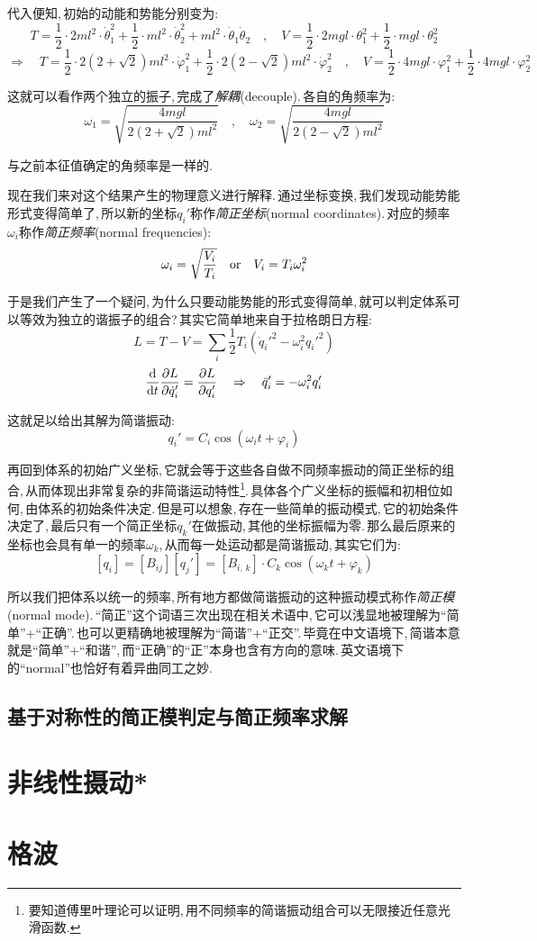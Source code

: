 代入便知,\,初始的动能和势能分别变为:
\[T=\frac{1}{2}\cdot 2ml^2\cdot\dot{\theta}_1^2+\frac{1}{2}\cdot ml^2\cdot\dot{\theta}_2^2+ml^2\cdot\dot{\theta}_1\dot{\theta}_2 \quad,\quad V=\frac{1}{2}\cdot 2mgl\cdot{\theta}_1^2+\frac{1}{2}\cdot mgl\cdot{\theta}_2^2\]
\[\Rightarrow \quad T=\frac{1}{2}\cdot 2(2+\sqrt{2})ml^2\cdot \dot{\varphi}_1^2+\frac{1}{2}\cdot 2(2-\sqrt{2})ml^2\cdot \dot{\varphi}_2^2\quad,\quad V=\frac{1}{2}\cdot 4mgl\cdot \varphi_1^2+\frac{1}{2}\cdot 4mgl\cdot \varphi_2^2\]

这就可以看作两个独立的振子,\,完成了\emph{解耦}(decouple).\,各自的角频率为:
\[\omega_1=\sqrt{\frac{4mgl}{2(2+\sqrt{2})ml^2}}\quad,\quad \omega_2=\sqrt{\frac{4mgl}{2(2-\sqrt{2})ml^2}}\]

与之前本征值确定的角频率是一样的.

现在我们来对这个结果产生的物理意义进行解释.\,通过坐标变换,\,我们发现动能势能形式变得简单了,\,所以新的坐标$q_i'$称作\emph{简正坐标}(normal coordinates).\,对应的频率$\omega_i$称作\emph{简正频率}(normal frequencies):
\[\omega_i=\sqrt\frac{V_i}{T_i}\quad {\rm or}\quad V_i=T_i\omega_i^2 \]

于是我们产生了一个疑问,\,为什么只要动能势能的形式变得简单,\,就可以判定体系可以等效为独立的谐振子的组合?\,其实它简单地来自于拉格朗日方程:
\[L=T-V=\sum_i\frac{1}{2}T_i(\dot{q}_i'^2-\omega_i^2q_i'^2)\]
\[\frac{\textrm{d} }{\textrm{d} t}\frac{\partial L}{\partial \dot{q}_i'}=\frac{\partial L}{\partial {q}_i'}\quad \Rightarrow \quad \ddot{q}'_i=-\omega_i^2q_i'\]

这就足以给出其解为简谐振动:
\[q_i'=C_i\cos(\omega_i t+\varphi_i)\]

再回到体系的初始广义坐标,\,它就会等于这些各自做不同频率振动的简正坐标的组合,\,从而体现出非常复杂的非简谐运动特性\footnote{要知道傅里叶理论可以证明,\,用不同频率的简谐振动组合可以无限接近任意光滑函数.}.\,具体各个广义坐标的振幅和初相位如何,\,由体系的初始条件决定.\,但是可以想象,\,存在一些简单的振动模式,\,它的初始条件决定了,\,最后只有一个简正坐标$q_k'$在做振动,\,其他的坐标振幅为零.\,那么最后原来的坐标也会具有单一的频率$\omega_k$,\,从而每一处运动都是简谐振动,\,其实它们为:
\[[q_i]=[B_{ij}][q_j']=[B_{i,\,k}]\cdot C_k\cos(\omega_k t+\varphi_k)\]

所以我们把体系以统一的频率,\,所有地方都做简谐振动的这种振动模式称作\emph{简正模}(normal mode).\,``简正''这个词语三次出现在相关术语中,\,它可以浅显地被理解为``简单''+``正确''.\,也可以更精确地被理解为``简谐''+``正交''.\,毕竟在中文语境下,\,简谐本意就是``简单''+``和谐'',\,而``正确''的``正''本身也含有方向的意味.\,英文语境下的``normal''也恰好有着异曲同工之妙.

\subsection{基于对称性的简正模判定与简正频率求解}



\section{非线性摄动*}

\section{格波}



